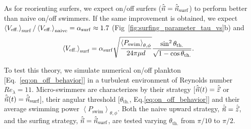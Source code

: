 As for reorienting surfers, we expect on/off surfers ($\hat{\vec{n}} = \hat{\vec{n}}_{\mathrm{surf}}$) to perform better than naive on/off swimmers.
If the same improvement is obtained, we expect $\left\langle V_{\mathrm{eff.}} \right\rangle_{\mathrm{surf}} / \left\langle V_{\mathrm{eff.}} \right\rangle_{\mathrm{naive}} = \alpha_{\mathrm{surf}} \approx 1.7$ (Fig~\ref{fig:surfing_parameter_tau_vs}b) and
\begin{equation}\label{eq:perf_surf}
	\left\langle V_{\mathrm{eff.}} \right\rangle_{\mathrm{surf}} = \alpha_{\mathrm{surf}} \sqrt{\frac{\left\langle P_{\mathrm{swim}} \right\rangle_{\theta, \phi}}{24 \pi \mu d}} \frac{\sin^2 \theta_{\mathrm{th.}}}{\sqrt{1 - \cos \theta_{\mathrm{th.}}}}.
\end{equation}

To test this theory, we simulate numerical on/off plankton [Eq.~\eqref{eq:on_off_behavior}] in a turbulent environment of Reynolds number $\mathit{Re}_{\lambda} = 11$.
Micro-swimmers are characterizes by their strategy [$\hat{\vec{n}}(t) = \hat{\vec{z}}$ or $\hat{\vec{n}}(t) = \hat{\vec{n}}_{\mathrm{surf}}$], their angular threshold [$\theta_{\mathrm{th.}}$, Eq.\eqref{eq:on_off_behavior}] and their average swimming power $\left\langle P_{\mathrm{swim}} \right\rangle_{\theta, \phi}$.
Both the naive upward strategy, $\hat{\vec{n}} = \hat{\vec{z}}$, and the surfing strategy, $\hat{\vec{n}} = \hat{\vec{n}}_{\mathrm{surf}}$, are tested varying $\theta_{\mathrm{th.}}$ from $\pi/10$ to $\pi/2$.

